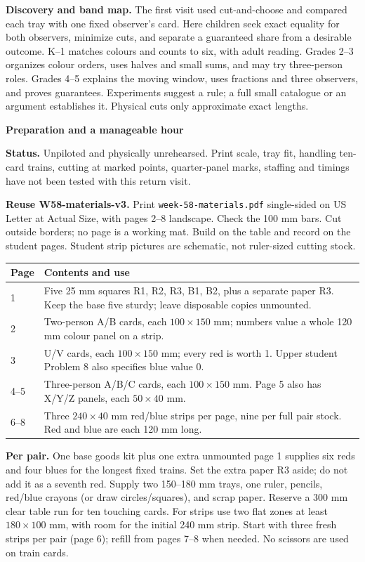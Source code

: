 \documentclass[11pt]{article}
\newcommand{\head}[1]{\par\textbf{\large #1}\par}
\begin{document}
\textbf{Discovery and band map.} The first visit used cut-and-choose and compared each tray with one fixed observer's card. Here children seek exact equality for both observers, minimize cuts, and separate a guaranteed share from a desirable outcome. K--1 matches colours and counts to six, with adult reading. Grades 2--3 organizes colour orders, uses halves and small sums, and may try three-person roles. Grades 4--5 explains the moving window, uses fractions and three observers, and proves guarantees. Experiments suggest a rule; a full small catalogue or an argument establishes it. Physical cuts only approximate exact lengths.
\newpage
\head{Preparation and a manageable hour}
\textbf{Status.} Unpiloted and physically unrehearsed. Print scale, tray fit, handling ten-card trains, cutting at marked points, quarter-panel marks, staffing and timings have not been tested with this return visit.

\textbf{Reuse W58-materials-v3.} Print \texttt{week-58-materials.pdf} single-sided on US Letter at Actual Size, with pages 2--8 landscape. Check the 100 mm bars. Cut outside borders; no page is a working mat. Build on the table and record on the student pages. Student strip pictures are schematic, not ruler-sized cutting stock.

\begin{tabular}{@{}p{.12\linewidth}p{.82\linewidth}@{}}
\textbf{Page} & \textbf{Contents and use}\\\midrule
1 & Five 25 mm squares R1, R2, R3, B1, B2, plus a separate paper R3. Keep the base five sturdy; leave disposable copies unmounted.\\
2 & Two-person A/B cards, each $100\times150$ mm; numbers value a whole 120 mm colour panel on a strip.\\
3 & U/V cards, each $100\times150$ mm; every red is worth 1. Upper student Problem 8 also specifies blue value 0.\\
4--5 & Three-person A/B/C cards, each $100\times150$ mm. Page 5 also has X/Y/Z panels, each $50\times40$ mm.\\
6--8 & Three $240\times40$ mm red/blue strips per page, nine per full pair stock. Red and blue are each 120 mm long.\\
\end{tabular}

\textbf{Per pair.} One base goods kit plus one extra unmounted page 1 supplies six reds and four blues for the longest fixed trains. Set the extra paper R3 aside; do not add it as a seventh red. Supply two 150--180 mm trays, one ruler, pencils, red/blue crayons (or draw circles/squares), and scrap paper. Reserve a 300 mm clear table run for ten touching cards. For strips use two flat zones at least $180\times100$ mm, with room for the initial 240 mm strip. Start with three fresh strips per pair (page 6); refill from pages 7--8 when needed. No scissors are used on train cards.
\end{document}
